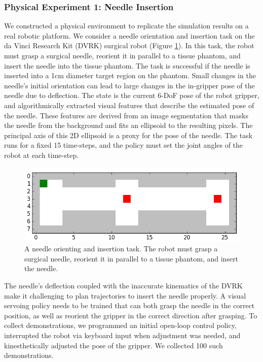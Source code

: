 \subsubsection{Physical Experiment 1: Needle Insertion}
We constructed a physical environment to replicate the simulation results on a real robotic platform.
We consider a needle orientation and insertion task on the da Vinci Research Kit (DVRK) surgical robot (Figure \ref{fig:dvrkexp3}). In this task, the robot must grasp a surgical needle, reorient it in parallel to a tissue phantom, and insert the needle into the tissue phantom.
The task is successful if the needle is inserted into a 1cm diameter target region on the phantom. Small changes in the needle's initial orientation can lead to large changes in the in-gripper pose of the needle due to deflection. 
The state is the current 6-DoF pose of the robot gripper, and algorithmically extracted visual features that describe the estimated pose of the needle.
These features are derived from an image segmentation that masks the needle from the background and fits an ellipsoid to the resulting pixels. 
The principal axis of this 2D ellipsoid is a proxy for the pose of the needle.
The task runs for a fixed 15 time-steps, and the policy must set the joint angles of the robot at each time-step.


\begin{figure}[ht!]
    \centering
    \includegraphics[width=\textwidth]{ddco-experiments/exp3.png}
    \caption{A needle orienting and insertion task. The robot must grasp a surgical needle, reorient it in parallel to a tissue phantom, and insert the needle.   \label{fig:dvrkexp3}}
\end{figure}

The needle's deflection coupled with the inaccurate kinematics of the DVRK make it challenging to plan trajectories to insert the needle properly.
A visual servoing policy needs to be trained that can both grasp the needle in the correct position, as well as reorient the gripper in the correct direction after grasping.
To collect demonstrations, we programmed an initial open-loop control policy, interrupted the robot via keyboard input when adjustment was needed, and kinesthetically adjusted the pose of the gripper. 
We collected 100 such demonstrations.

